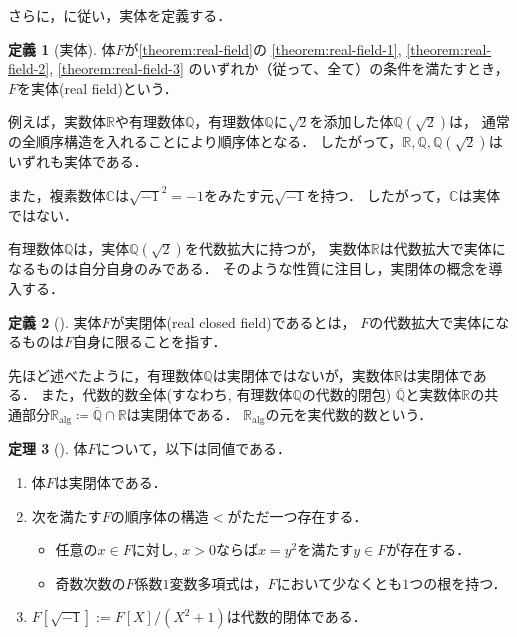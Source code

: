 \documentclass[uplatex, dvipdfmx]{jsarticle}
\numberwithin{equation}{section}
\newcommand{\R}{\mathbb{R}}
\newcommand{\Q}{\mathbb{Q}}
\newcommand{\C}{\mathbb{C}}
\newcommand{\Ralg}{\mathbb{R}_\mathrm{alg}}
\theoremstyle{definition}
\newtheorem{definition}{定義}[section]
\newtheorem{theorem}[definition]{定理}
\begin{document}
さらに，\cite[Definition 1.1.9.]{MR1659509}に従い，実体を定義する．

\begin{definition}[実体]
     体$F$が\cref{theorem:real-field}の
     \ref{theorem:real-field-1},
     \ref{theorem:real-field-2},
     \ref{theorem:real-field-3}
     のいずれか（従って、全て）の条件を満たすとき，
     $F$を実体(real field)という．
\end{definition}


例えば，実数体$\R$や有理数体$\Q$，有理数体$\Q$に$\sqrt{2}$を添加した体$\Q\left(\sqrt{2}\right)$は，
通常の全順序構造を入れることにより順序体となる．
したがって，$\R, \Q, \Q\left(\sqrt{2}\right)$はいずれも実体である．

また，複素数体$\C$は$\sqrt{-1}^2 = -1$をみたす元$\sqrt{-1}$を持つ．
したがって，$\C$は実体ではない．

有理数体$\Q$は，実体$\Q\left(\sqrt{2}\right)$を代数拡大に持つが，
実数体$\R$は代数拡大で実体になるものは自分自身のみである．
そのような性質に注目し，実閉体の概念を導入する．

\begin{definition}[{\cite[Section I]{MR3069467}}] \label{definition:RCF}
     実体$F$が実閉体(real closed field)であるとは，
     $F$の代数拡大で実体になるものは$F$自身に限ることを指す．
\end{definition}

先ほど述べたように，有理数体$\Q$は実閉体ではないが，実数体$\R$は実閉体である．
また，代数的数全体(すなわち, 有理数体$\Q$の代数的閉包) $\overline{\Q}$と実数体$\R$の共通部分$\Ralg \coloneqq \overline{\Q} \cap \R$は実閉体である．
$\Ralg$の元を実代数的数という．

\begin{theorem}[{\cite[S\"{a}tze 1--3]{MR3069467}}] \label{theorem:real-closed-field}
     体$F$について，以下は同値である．
     \begin{enumerate}
          \item 体$F$は実閉体である．
          \item 次を満たす$F$の順序体の構造$<$がただ一つ存在する．
               \begin{itemize}
                    \item 任意の$x \in F$に対し, $x>0$ならば$x = y^2$を満たす$y \in F$が存在する．
                    \item 奇数次数の$F$係数$1$変数多項式は，$F$において少なくとも$1$つの根を持つ．
               \end{itemize}
          \item $F\left[\sqrt{-1}\right] := F[X]/(X^2 + 1)$は代数的閉体である．
     \end{enumerate}
\end{theorem}
\end{document}
